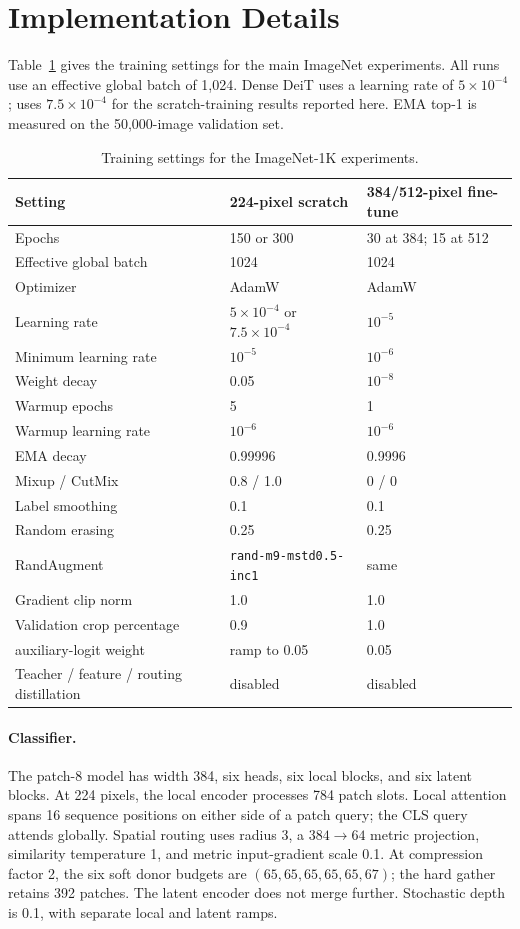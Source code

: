 \section{Implementation Details}
\label{app:recipe}

Table~\ref{tab:recipe} gives the training settings for the main ImageNet
experiments. All runs use an effective global batch of 1,024. Dense DeiT
uses a learning rate of $5\times10^{-4}$; \mn{}
uses $7.5\times10^{-4}$ for the scratch-training results reported here.
EMA top-1 is measured on the 50,000-image validation set.

\begin{table}[h]
\caption{Training settings for the ImageNet-1K experiments.}
\label{tab:recipe}
\centering\small
\begin{tabular}{lll}
\toprule
Setting & 224-pixel scratch & 384/512-pixel fine-tune\\
\midrule
Epochs & 150 or 300 & 30 at 384; 15 at 512\\
Effective global batch & 1024 & 1024\\
Optimizer & AdamW & AdamW\\
Learning rate & $5\!\times\!10^{-4}$ or $7.5\!\times\!10^{-4}$ & $10^{-5}$\\
Minimum learning rate & $10^{-5}$ & $10^{-6}$\\
Weight decay & 0.05 & $10^{-8}$\\
Warmup epochs & 5 & 1\\
Warmup learning rate & $10^{-6}$ & $10^{-6}$\\
EMA decay & 0.99996 & 0.9996\\
Mixup / CutMix & 0.8 / 1.0 & 0 / 0\\
Label smoothing & 0.1 & 0.1\\
Random erasing & 0.25 & 0.25\\
RandAugment & \texttt{rand-m9-mstd0.5-inc1} & same\\
Gradient clip norm & 1.0 & 1.0\\
Validation crop percentage & 0.9 & 1.0\\
\mn{} auxiliary-logit weight & ramp to 0.05 & 0.05\\
Teacher / feature / routing distillation & disabled & disabled\\
\bottomrule
\end{tabular}
\end{table}

\paragraph{Classifier.}
The patch-8 model has width 384, six heads, six local blocks, and six latent
blocks. At 224 pixels, the local encoder processes 784 patch slots. Local
attention spans 16 sequence positions on either side of a patch query;
the CLS query attends globally. Spatial routing uses radius 3, a
$384\to64$ metric projection, similarity temperature 1, and metric
input-gradient scale 0.1. At compression factor 2, the six soft donor
budgets are $(65,65,65,65,65,67)$; the hard gather retains 392 patches.
The latent encoder does not merge further. Stochastic depth is 0.1,
with separate local and latent ramps.

